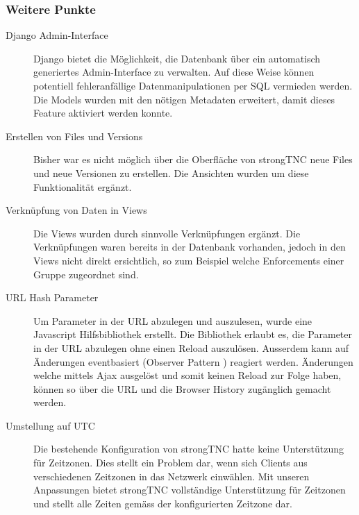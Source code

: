 \subsubsection{Weitere Punkte}
\begin{description}
\item[Django Admin-Interface] Django bietet die Möglichkeit, die Datenbank über
ein automatisch generiertes Admin-Interface zu verwalten. Auf diese Weise
können potentiell fehleranfällige Datenmanipulationen per SQL vermieden
werden. Die Models wurden mit den nötigen Metadaten erweitert, damit dieses
Feature aktiviert werden konnte.

\item[Erstellen von Files und Versions] Bisher war es nicht möglich über die
Oberfläche von strongTNC neue Files und neue Versionen zu erstellen. Die
Ansichten wurden um diese Funktionalität ergänzt.

\item[Verknüpfung von Daten in Views] Die Views wurden durch sinnvolle
Verknüpfungen ergänzt. Die  Verknüpfungen waren bereits in der Datenbank
vorhanden, jedoch in den Views nicht direkt ersichtlich, so zum Beispiel welche
Enforcements einer Gruppe zugeordnet sind.

\item[URL Hash Parameter] Um Parameter in der URL abzulegen und auszulesen,
wurde eine Javascript Hilfsbibliothek erstellt. Die Bibliothek erlaubt es, die
Parameter in der URL abzulegen ohne einen Reload auszulösen. Ausserdem kann auf
Änderungen eventbasiert (Observer Pattern \cite{gamma1994design}) reagiert werden.
Änderungen welche mittels Ajax ausgelöst und somit keinen Reload zur Folge
haben, können so über die URL und die Browser History zugänglich gemacht werden.

\item[Umstellung auf UTC] Die bestehende Konfiguration von strongTNC hatte keine
Unterstützung für Zeitzonen. Dies stellt ein Problem dar, wenn sich Clients aus
verschiedenen Zeitzonen in das Netzwerk einwählen. Mit unseren Anpassungen
bietet strongTNC vollständige Unterstützung für Zeitzonen und stellt alle Zeiten
gemäss der konfigurierten Zeitzone dar.

\end{description}




